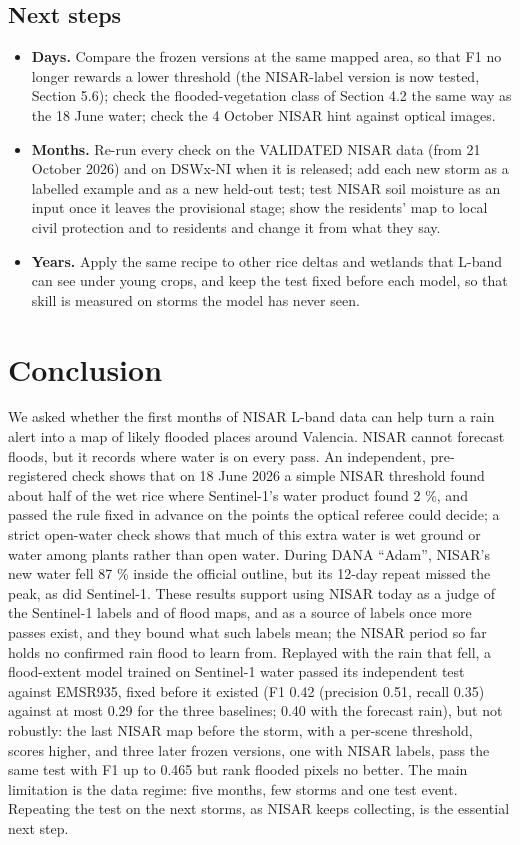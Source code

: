 \documentclass[10pt,twocolumn]{article}
\begin{document}
\subsection{Next steps}
\begin{itemize}
\item{} \textbf{Days.} Compare the frozen versions at the same mapped area, so that F1 no longer rewards a lower threshold (the NISAR-label version is now tested, Section 5.6); check the flooded-vegetation class of Section 4.2 the same way as the 18 June water; check the 4 October NISAR hint against optical images.
\item{} \textbf{Months.} Re-run every check on the VALIDATED NISAR data (from 21 October 2026) and on DSWx-NI when it is released; add each new storm as a labelled example and as a new held-out test; test NISAR soil moisture as an input once it leaves the provisional stage; show the residents' map to local civil protection and to residents and change it from what they say.
\item{} \textbf{Years.} Apply the same recipe to other rice deltas and wetlands that L-band can see under young crops, and keep the test fixed before each model, so that skill is measured on storms the model has never seen.
\end{itemize}
\section{Conclusion}
We asked whether the first months of NISAR L-band data can help turn a rain alert into a map of likely flooded places around Valencia. NISAR cannot forecast floods, but it records where water is on every pass. An independent, pre-registered check shows that on 18 June 2026 a simple NISAR threshold found about half of the wet rice where Sentinel-1's water product found 2 \%, and passed the rule fixed in advance on the points the optical referee could decide; a strict open-water check shows that much of this extra water is wet ground or water among plants rather than open water. During DANA ``Adam'', NISAR's new water fell 87 \% inside the official outline, but its 12-day repeat missed the peak, as did Sentinel-1. These results support using NISAR today as a judge of the Sentinel-1 labels and of flood maps, and as a source of labels once more passes exist, and they bound what such labels mean; the NISAR period so far holds no confirmed rain flood to learn from. Replayed with the rain that fell, a flood-extent model trained on Sentinel-1 water passed its independent test against EMSR935, fixed before it existed (F1 0.42 (precision 0.51, recall 0.35) against at most 0.29 for the three baselines; 0.40 with the forecast rain), but not robustly: the last NISAR map before the storm, with a per-scene threshold, scores higher, and three later frozen versions, one with NISAR labels, pass the same test with F1 up to 0.465 but rank flooded pixels no better. The main limitation is the data regime: five months, few storms and one test event. Repeating the test on the next storms, as NISAR keeps collecting, is the essential next step.
\end{document}
